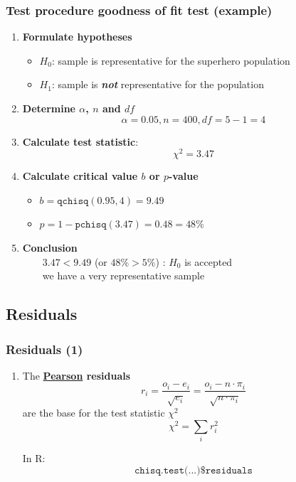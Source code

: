 \documentclass{beamer}
\begin{document}
\begin{frame}
\frametitle{Test procedure goodness of fit test (example)}
\begin{enumerate}
    \item \textbf{Formulate hypotheses}
      \begin{itemize}
        \item $H_{0}$: sample is representative for the superhero population
        \item $H_{1}$: sample is \textbf{\emph{not}} representative for the population
      \end{itemize}
    \item \textbf{Determine $\alpha$, $n$ and $df$}
        \[ \alpha = 0.05 , n = 400, df = 5-1 = 4 \]
    \item \textbf{Calculate test statistic}:
        \[ \chi^{2} = 3.47 \]
    \item \textbf{Calculate critical value $b$ or $p$-value}
      \begin{itemize}
        \item $b = \texttt{qchisq}(0.95,4) = 9.49$
        \item $p = 1-\texttt{pchisq}(3.47) = 0.48 = 48\%$
      \end{itemize}
    \item \textbf{Conclusion}\\
    ~~~~$3.47 < 9.49$ (or $48\% > 5\%$) : $H_0$ is accepted\\
    ~~~~we have a very representative sample
\end{enumerate}
\end{frame}

\subsection{Residuals}

\begin{frame}
\frametitle{Residuals (1)}


\begin{enumerate}
    \item The \textbf{\underline{Pearson} residuals}
    \[ r_i = \frac{o_i-e_i}{\sqrt{e_i}} = \frac{o_i - n \cdot \pi_i}{\sqrt{n \cdot \pi_i}} \]
    are the base for the test statistic $\chi^2$
    \[ \chi^2 = \sum_{i}{r_i^2} \]

In R:
\[ \texttt{chisq.test(...)\$residuals} \]
\end{enumerate}

\end{frame}
\end{document}
